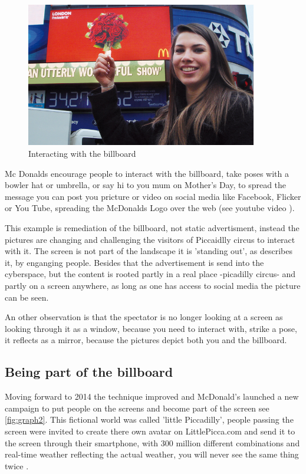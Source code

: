\documentclass[a4paper, 11pt]{article}
\begin{document}
\begin{figure}[h!]
    \centering
    \includegraphics[width=0.9\textwidth]{weights.png}
    \caption{Interacting with the billboard \citep{campaign2009}}
    \label{fig:graph1}
\end{figure}

Mc Donalds encourage people to interact with the billboard, take poses with a bowler hat or umbrella, or say hi to you mum on Mother's Day, to spread the message you can post you pricture or video on social media like Facebook, Flicker or You Tube, spreading the McDonalds Logo over the web (see youtube video \citep{youtube2009}).  

This example is remediation of the billboard, not static advertisment, instead the pictures are changing and challenging the visitors of Piccaidlly circus to interact with it. The screen is not part of the landscape it is 'standing out', as \cite{Slaatta2006} describes it, by enganging people. Besides that the advertisement is send into the cyberspace, but the content is rooted partly in a real place -picadilly circus- and partly on a screen anywhere, as long as one has access to social media the picture can be seen.  

An other observation is that the spectator is no longer looking at a screen as looking through it as a window, because you need to interact with, strike a pose, it reflects as a mirror, because the pictures depict both you and the billboard.


\subsection {Being part of the billboard}
Moving forward to 2014 the technique improved and McDonald's launched a new campaign to put people on the screens and become part of the screen see \ref{fig:graph2}. This fictional world was called 'little Piccadilly', people passing the screen were invited to create there own avatar on LittlePicca.com and send it to the screen through their smartphone, with 300 million different combinations and real-time weather reflecting the actual weather, you will never see the same thing twice \citep{youtube2015}. 
\end{document}
